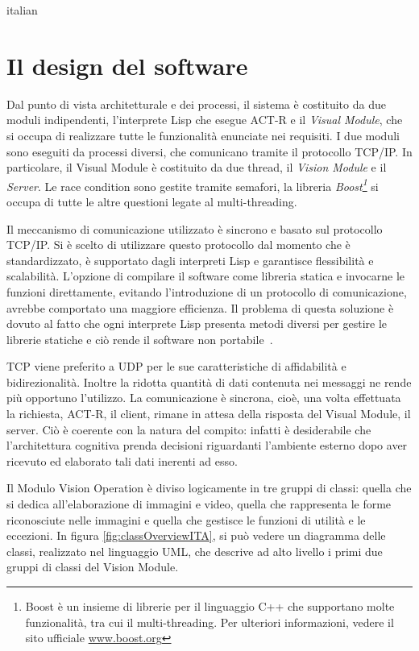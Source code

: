 \begin{otherlanguage*}{italian}
			

	\section*{Il design del software}

		Dal punto di vista architetturale e dei processi, il sistema è costituito da due moduli indipendenti, l'interprete Lisp che esegue \mbox{ACT-R} e il \emph{Visual Module}, che si occupa di realizzare tutte le funzionalità enunciate nei requisiti.
		I due moduli sono eseguiti da processi diversi, che comunicano tramite il protocollo \mbox{TCP/IP}.
		In particolare, il Visual Module è costituito da due thread, il \emph{Vision Module} e il \emph{Server}.
		Le race condition sono gestite tramite semafori, la libreria \emph{Boost\footnote{Boost è un insieme di librerie per il linguaggio C++ che supportano molte funzionalità, tra cui il multi-threading. Per ulteriori informazioni, vedere il sito ufficiale \url{www.boost.org}}} si occupa di tutte le altre questioni legate al multi-threading.
		
		Il meccanismo di comunicazione utilizzato è sincrono e basato sul protocollo \mbox{TCP/IP}.
		Si è scelto di utilizzare questo protocollo dal momento che è standardizzato, è supportato dagli interpreti Lisp e garantisce flessibilità e scalabilità.
		L'opzione di compilare il software come libreria statica e invocarne le funzioni direttamente, evitando l'introduzione di un protocollo di comunicazione, avrebbe comportato una maggiore efficienza.
		Il problema di questa soluzione è dovuto al fatto che ogni interprete Lisp presenta metodi diversi per gestire le librerie statiche e ciò rende il software non portabile~\cite{SWIGDoc}.

		TCP viene preferito a UDP per le sue caratteristiche di affidabilità e bidirezionalità.
		Inoltre la ridotta quantità di dati contenuta nei messaggi ne rende più opportuno l'utilizzo.
		La comunicazione è sincrona, cioè, una volta effettuata la richiesta, \mbox{ACT-R}, il client, rimane in attesa della risposta del Visual Module, il server. 
		Ciò è coerente con la natura del compito: infatti è desiderabile che l'architettura cognitiva prenda decisioni riguardanti l'ambiente esterno dopo aver ricevuto ed elaborato tali dati inerenti ad esso.

		Il Modulo Vision Operation è diviso logicamente in tre gruppi di classi: quella che si dedica all'elaborazione di immagini e video, quella che rappresenta le forme riconosciute nelle immagini e quella che gestisce le funzioni di utilità e le eccezioni.
		In figura \ref{fig:classOverviewITA}, si può vedere un diagramma delle classi, realizzato nel linguaggio UML, che descrive ad alto livello i primi due gruppi di classi del Vision Module.
	

\end{otherlanguage*}
